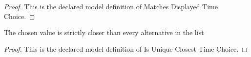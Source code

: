 \begin{proof}
  This is the declared model definition of Matches Displayed Time Choice.
\end{proof}
\begin{definition}
  \label{def:physics:phyx-mini-0528:phyxminiproblems-problemphyxmini0528-isuniqueclosesttimechoice}
  The chosen value is strictly closer than every alternative in the list
\end{definition}
\begin{proof}
  This is the declared model definition of Is Unique Closest Time Choice.
\end{proof}
